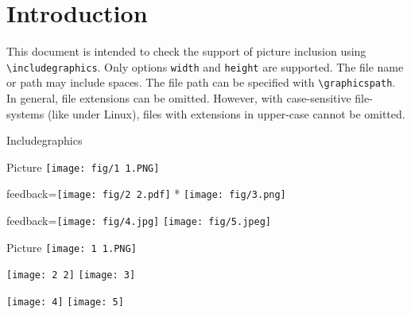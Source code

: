 \documentclass{article}
\begin{document}
\section*{Introduction}

This document is intended to check the support of picture inclusion using 
\verb|\includegraphics|. Only options \texttt{width} and \texttt{height} are 
supported. The file name or path may include spaces. The file path can be 
specified with \verb|\graphicspath|. In general, file extensions can be 
omitted. However, with case-sensitive file-systems (like under Linux), files 
with extensions in upper-case cannot be omitted.

\begin{quiz}{Includegraphics}

\begin{multi}{Picture}
\texttt{[image: fig/1 1.PNG]}
\item[feedback={\texttt{[image: fig/2 2.pdf]}}]* \texttt{[image: fig/3.png]}
\item[feedback={\texttt{[image: fig/4.jpg]}}] \texttt{[image: fig/5.jpeg]}
\end{multi}

\graphicspath{{./fig/}}

\begin{matching}[dd]{Picture}
\texttt{[image: 1 1.PNG]}%
\item \texttt{[image: 2 2]} \answer \texttt{[image: 3]}
\item \texttt{[image: 4]} \answer \texttt{[image: 5]}
\end{matching}

\end{quiz}
\end{document}
